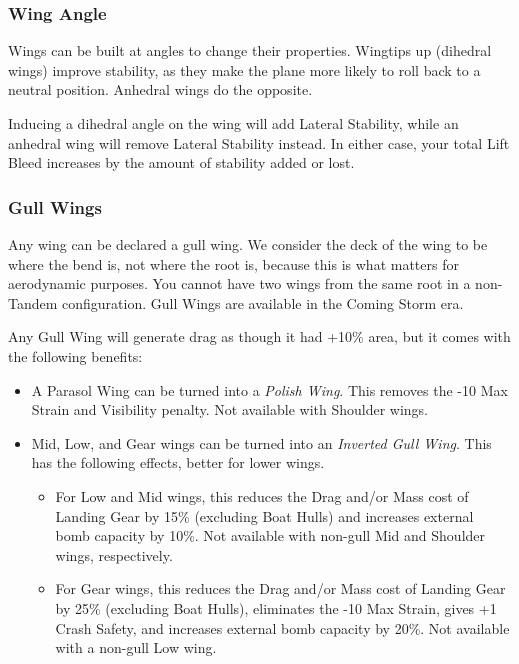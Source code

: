 \documentclass{article}
\begin{document}
\subsubsection{Wing Angle}
\label{_Wing Angle}

Wings can be built at angles to change their properties. Wingtips up
(dihedral wings) improve stability, as they make the plane more likely
to roll back to a neutral position. Anhedral wings do the opposite.

Inducing a dihedral angle on the wing will add Lateral Stability, while
an anhedral wing will remove Lateral Stability instead. In either case,
your total Lift Bleed increases by the amount of stability added or
lost.

\subsubsection{Gull Wings}
\label{_Gull Wings}

Any wing can be declared a gull wing. We consider the deck of the wing
to be where the bend is, not where the root is, because this is what
matters for aerodynamic purposes. You cannot have two wings from the
same root in a non-Tandem configuration. Gull Wings are available in the
Coming Storm era.

Any Gull Wing will generate drag as though it had +10\% area, but it
comes with the following benefits:

\begin{itemize}
  \item          {A Parasol Wing can be turned into a }\emph{{Polish
              Wing}}{. This removes the -10 Max Strain and Visibility penalty.
          Not available with Shoulder wings.}
  \item          {Mid, Low, and Gear wings can be turned into an
        }\emph{Inverted Gull Wing}{. This has the following
          effects, better for lower wings.}

        \begin{itemize}
          \item                    For Low and Mid wings, this reduces the Drag and/or Mass cost
                of Landing Gear by 15\% (excluding Boat Hulls) and increases
                external bomb capacity by 10\%. Not available with non-gull Mid and
                Shoulder wings, respectively.
          \item                    For Gear wings, this reduces the Drag and/or Mass cost of
                Landing Gear by 25\% (excluding Boat Hulls), eliminates the -10 Max
                Strain, gives +1 Crash Safety, and increases external bomb capacity
                by 20\%. Not available with a non-gull Low wing.
        \end{itemize}
\end{itemize}
\end{document}
